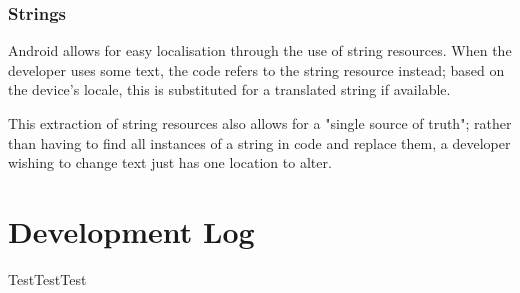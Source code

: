 \documentclass[11pt, a4paper, notitlepage]{report}
\begin{document}
\subsection{Strings}
Android allows for easy localisation through the use of string resources. When the developer uses some text, the code refers to the string resource instead; based on the device's locale, this is substituted for a translated string if available.

This extraction of string resources also allows for a "single source of truth"; rather than having to find all instances of a string in code and replace them, a developer wishing to change text just has one location to alter.

\appendix
\chapter{Development Log}\label{app:GitLog}
TestTestTest


\end{document}
